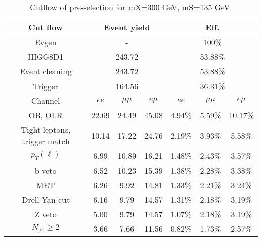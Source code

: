 \begin{table}
\centering\small
\begin{tabular}{c|ccc|ccc}
\hline
\hline
Cut flow &\multicolumn{3}{c|}{Event yield}&\multicolumn{3}{c}{Eff.}      \\
\hline
Evgen&\multicolumn{3}{c|}{-}&\multicolumn{3}{c}{100\%}\\
HIGG8D1&\multicolumn{3}{c|}{243.72}&\multicolumn{3}{c}{53.88\%}\\
Event cleaning&\multicolumn{3}{c|}{243.72}&\multicolumn{3}{c}{53.88\%}\\
Trigger&\multicolumn{3}{c|}{164.56    }&\multicolumn{3}{c}{36.31\%}\\
Channel&$ee$&$\mu\mu$&$e\mu$&$ee$&$\mu\mu$&$e\mu$\\
\hline
OB, OLR    &22.69    &24.49    &45.08& 4.94\%    &5.59\%    &10.17\%\\
Tight leptons, trigger match    &10.14    &17.22    &24.76    &2.19\%    &3.93\%    &5.58\%\\
$p_T(\ell)$    &6.99    &10.89    &16.21    &1.48\%    &2.43\%    &3.57\%\\
b veto    &6.52    &10.23    &15.39    &1.38\%    &2.28\%    &3.38\%\\
MET    &6.26    &9.92    &14.81    &1.33\%    &2.21\%    &3.24\%\\
Drell-Yan cut    &6.16    &9.79    &14.57    &1.31\%    &2.18\%    &3.19\%\\
Z veto    &5.00    &9.79    &14.57    &1.07\%    &2.18\%    &3.19\%\\
$N_{\text{jet}}\geq2$    &3.66    &7.66    &11.56    &0.82\%    &1.73\%    &2.57\%\\
\hline
\hline
\end{tabular}
\caption{Cutflow of pre-selection for mX=300 GeV, mS=135 GeV.}
\label{tab:cut_flow_preselection_mX260}
\end{table}
